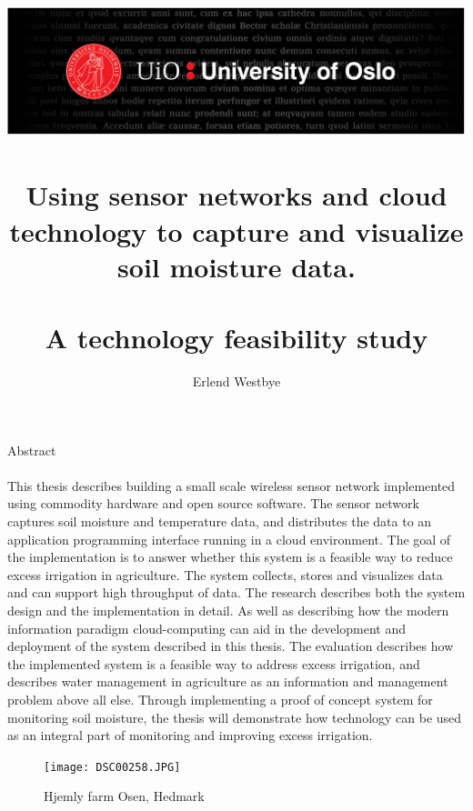 \documentclass[]{uiophd}
\begin{document}
\title{\includegraphics[scale=0.5]{toppfelt-english.jpg}\\\\
Using sensor networks and cloud technology to capture and visualize soil moisture data.
\\\\
\large A technology feasibility study}
\author{Erlend Westbye}


\frontmatter
\maketitle

Abstract
\\\\
This thesis describes building a small scale wireless sensor network implemented using commodity hardware and open source software. The sensor network captures soil moisture and temperature data, and distributes the data to an application programming interface running in a cloud environment. The goal of the implementation is to answer whether this system is a feasible way to reduce excess irrigation in agriculture. The system collects, stores and visualizes data and can support high throughput of data. The research describes both the system design and the implementation in detail. As well as describing how the modern information paradigm cloud-computing can aid in the development and deployment of the system described in this thesis. The evaluation describes how the implemented system is a feasible way to address excess irrigation, and describes water management in agriculture as an information and management problem above all else. Through implementing a proof of concept system for monitoring soil moisture, the thesis will demonstrate how technology can be used as an integral part of monitoring and improving excess irrigation.

\begin{figure}[h]
\caption{Hjemly farm Osen, Hedmark}
\centering
\texttt{[image: DSC00258.JPG]}
\end{figure}
\tableofcontents
\linespread{1.3}

\mainmatter
\end{document}
